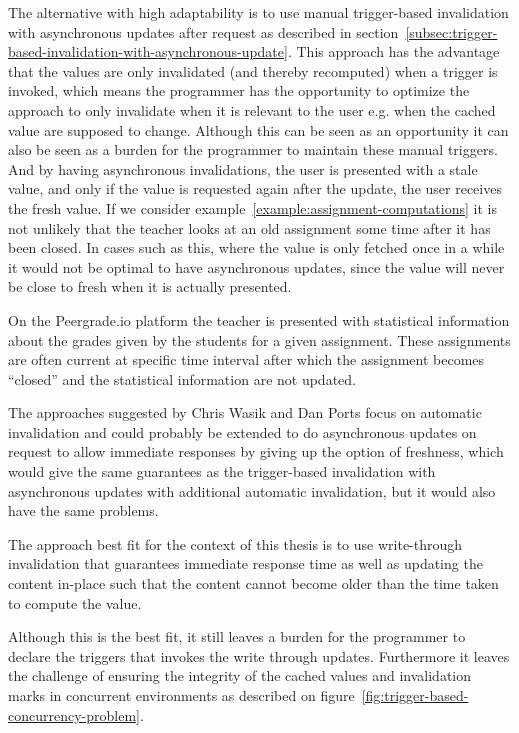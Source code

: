 The alternative with high adaptability is to use manual trigger-based invalidation with asynchronous updates after request as described in section~\ref{subsec:trigger-based-invalidation-with-asynchronous-update}. This approach has the advantage that the values are only invalidated (and thereby recomputed) when a trigger is invoked, which means the programmer has the opportunity to optimize the approach to only invalidate when it is relevant to the user e.g. when the cached value are supposed to change. Although this can be seen as an opportunity it can also be seen as a burden for the programmer to maintain these manual triggers. And by having asynchronous invalidations, the user is presented with a stale value, and only if the value is requested again after the update, the user receives the fresh value. If we consider example~\ref{example:assignment-computations} it is not unlikely that the teacher looks at an old assignment some time after it has been closed. In cases such as this, where the value is only fetched once in a while it would not be optimal to have asynchronous updates, since the value will never be close to fresh when it is actually presented.
\begin{example}
\label{example:assignment-computations}
On the Peergrade.io platform the teacher is presented with statistical information about the grades given by the students for a given assignment. These assignments are often current at specific time interval after which the assignment becomes ``closed'' and the statistical information are not updated.
\end{example}
The approaches suggested by Chris Wasik and Dan Ports focus on automatic invalidation and could probably be extended to do asynchronous updates on request to allow immediate responses by giving up the option of freshness, which would give the same guarantees as the trigger-based invalidation with asynchronous updates with additional automatic invalidation, but it would also have the same problems.

The approach best fit for the context of this thesis is to use write-through invalidation that guarantees immediate response time as well as updating the content in-place such that the content cannot become older than the time taken to compute the value.

Although this is the best fit, it still leaves a burden for the programmer to declare the triggers that invokes the write through updates. Furthermore it leaves the challenge of ensuring the integrity of the cached values and invalidation marks in concurrent environments as described on figure~\ref{fig:trigger-based-concurrency-problem}.

